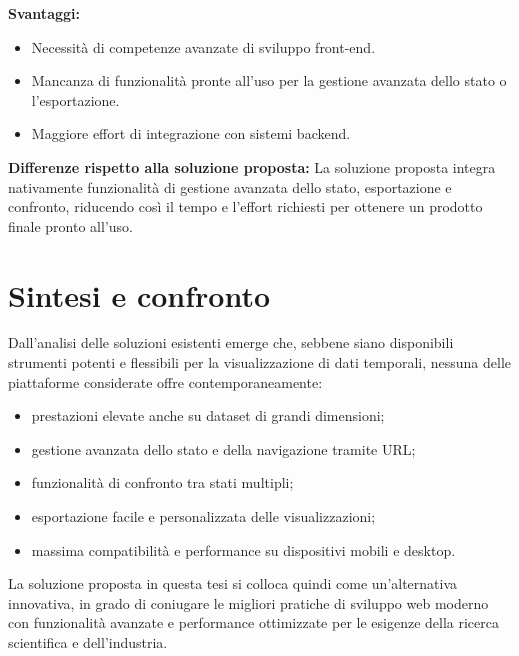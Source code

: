 \textbf{Svantaggi:}
\begin{itemize}
    \item Necessità di competenze avanzate di sviluppo front-end.
    \item Mancanza di funzionalità pronte all’uso per la gestione avanzata dello stato o l’esportazione.
    \item Maggiore effort di integrazione con sistemi backend.
\end{itemize}

\textbf{Differenze rispetto alla soluzione proposta:}
La soluzione proposta integra nativamente funzionalità di gestione avanzata dello stato, esportazione e confronto, riducendo così il tempo e l’effort richiesti per ottenere un prodotto finale pronto all’uso.

\section{Sintesi e confronto}

Dall’analisi delle soluzioni esistenti emerge che, sebbene siano disponibili strumenti potenti e flessibili per la visualizzazione di dati temporali, nessuna delle piattaforme considerate offre contemporaneamente:
\begin{itemize}
    \item prestazioni elevate anche su dataset di grandi dimensioni;
    \item gestione avanzata dello stato e della navigazione tramite URL;
    \item funzionalità di confronto tra stati multipli;
    \item esportazione facile e personalizzata delle visualizzazioni;
    \item massima compatibilità e performance su dispositivi mobili e desktop.
\end{itemize}

La soluzione proposta in questa tesi si colloca quindi come un’alternativa innovativa, in grado di coniugare le migliori pratiche di sviluppo web moderno con funzionalità avanzate e performance ottimizzate per le esigenze della ricerca scientifica e dell’industria.
